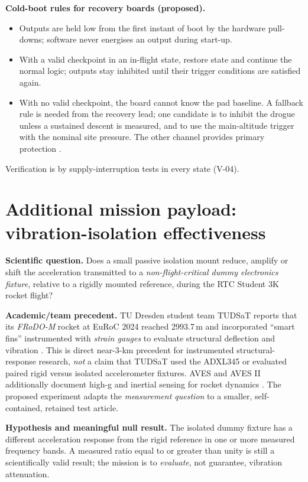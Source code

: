 \textbf{Cold-boot rules for recovery boards (proposed).}
\begin{itemize}
\item Outputs are held low from the first instant of boot by the hardware pull-downs; software never energises an output during start-up.
\item With a valid checkpoint in an in-flight state, restore state and continue the normal logic; outputs stay inhibited until their trigger conditions are satisfied again.
\item With no valid checkpoint, the board cannot know the pad baseline. A fallback rule is needed from the recovery lead; one candidate is to inhibit the drogue unless a sustained descent is measured, and to use the main-altitude trigger with the nominal site pressure. The other channel provides primary protection .
\end{itemize}
Verification is by supply-interruption tests in every state (V-04).

\section{Additional mission payload: vibration-isolation effectiveness}
\label{sec:payload}
\textbf{Scientific question.} Does a small passive isolation mount reduce, amplify or shift the acceleration transmitted to a \emph{non-flight-critical dummy electronics fixture}, relative to a rigidly mounted reference, during the RTC Student 3K rocket flight?

\textbf{Academic/team precedent.} TU Dresden student team TUDSaT reports that its \emph{FRoDO-M} rocket at EuRoC 2024 reached 2993.7\,m and incorporated ``smart fins'' instrumented with \emph{strain gauges} to evaluate structural deflection and vibration \cite{tudsat2024frodo}. This is direct near-3-km precedent for instrumented structural-response research, \emph{not} a claim that TUDSaT used the ADXL345 or evaluated paired rigid versus isolated accelerometer fixtures. AVES and AVES II additionally document high-g and inertial sensing for rocket dynamics \cite{astg2021aves,astg2022aves2}. The proposed experiment adapts the \emph{measurement question} to a smaller, self-contained, retained test article.

\textbf{Hypothesis and meaningful null result.} The isolated dummy fixture has a different acceleration response from the rigid reference in one or more measured frequency bands. A measured ratio equal to or greater than unity is still a scientifically valid result; the mission is to \emph{evaluate}, not guarantee, vibration attenuation.

